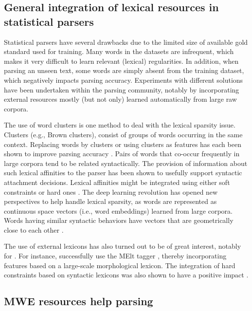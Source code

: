 \documentclass[output=paper]{langsci/langscibook}
\begin{document}
\subsection{General integration of lexical resources in statistical parsers}
\label{con:ssec:lexres-parse}

Statistical parsers have several drawbacks due to the limited size of available gold standard  used for training. Many words in the datasets are  infrequent, which makes it very difficult to learn relevant (lexical) regularities. In addition, when parsing an unseen text, some words are simply absent from  the training dataset, which negatively impacts parsing accuracy. Experiments with  different solutions have been undertaken within the parsing community, notably by incorporating external resources mostly (but not only) learned automatically from large raw corpora.

The use of word clusters is one method to deal with the lexical sparsity issue. Clusters (e.g., Brown clusters), consist of groups of words occurring in the same  context. 
Replacing words by clusters or using clusters as features has each been shown to improve parsing accuracy  \citep{koo-carreras-collins:2008:aclmain,candito-seddah:2010:spmrl}.
Pairs of words that co-occur frequently in large corpora tend to be related syntactically. 
The provision of information about such lexical affinities to the parser has been shown to usefully support  syntactic attachment decisions. 
Lexical affinities might be integrated using either soft constraints \citep{bansal:11,mirroshandel:12} or hard ones \citep{mirroshandel:2016}. 
The deep learning revolution has opened new perspectives to help handle lexical sparsity, as words are represented as continuous space vectors (i.e., word embeddings) learned from large corpora. Words having similar syntactic behaviors have vectors that are geometrically close to each other \citep{durrett:15,dyer:15}.

The use of external lexicons has also turned out to be of great interest, notably for . For instance, \citet{candito:2010} successfully use the MElt tagger \citep{denis:2012}, thereby incorporating features based on a large-scale morphological lexicon. The integration of hard constraints based on syntactic lexicons was also shown to have a positive impact \citep{mirroshandel:2013}. 


\subsection{MWE resources help parsing}
\label{con:ssec:mwe-help-parse}
\end{document}
